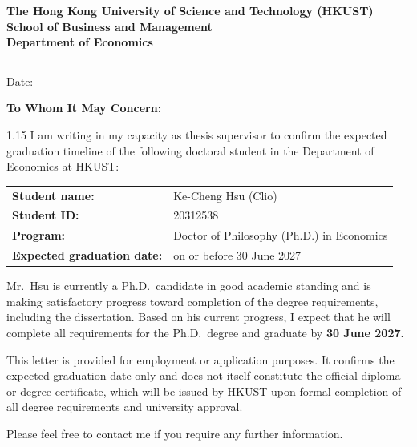 \documentclass[11pt,a4paper]{letter}
\begin{document}
\begin{center}
{\large\textbf{The Hong Kong University of Science and Technology (HKUST)}}\\[2pt]
{\textbf{School of Business and Management}}\\[2pt]
{\textbf{Department of Economics}}
\end{center}

\vspace{0.25cm}
\hrule
\vspace{0.45cm}

\begin{flushright}
Date: \underline{\hspace{4.5cm}}
\end{flushright}

\vspace{0.15cm}

\textbf{To Whom It May Concern:}

\vspace{0.2cm}

\begin{spacing}{1.15}
I am writing in my capacity as thesis supervisor to confirm the expected graduation timeline of the following doctoral student in the Department of Economics at HKUST:

\vspace{0.25cm}
\begin{tabular}{@{}ll@{}}
\textbf{Student name:} & Ke-Cheng Hsu (Clio)\\
\textbf{Student ID:} & 20312538\\
\textbf{Program:} & Doctor of Philosophy (Ph.D.) in Economics\\
\textbf{Expected graduation date:} & on or before 30 June 2027\\
\end{tabular}

\vspace{0.35cm}
Mr.\ Hsu is currently a Ph.D.\ candidate in good academic standing and is making satisfactory progress toward completion of the degree requirements, including the dissertation. Based on his current progress, I expect that he will complete all requirements for the Ph.D.\ degree and graduate by \textbf{30 June 2027}.

This letter is provided for employment or application purposes. It confirms the expected graduation date only and does not itself constitute the official diploma or degree certificate, which will be issued by HKUST upon formal completion of all degree requirements and university approval.

Please feel free to contact me if you require any further information.
\end{spacing}
\end{document}
